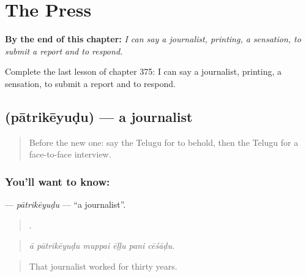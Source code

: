 
\chapter{The Press}
\label{ch:te-the-press}

\begin{chapteropening}
\textbf{By the end of this chapter:} \emph{I can say a journalist, printing, a sensation, to submit a report and to respond.}

Complete the last lesson of chapter 375: I can say a journalist, printing, a sensation, to submit a report and to respond.
\end{chapteropening}

\section[\texorpdfstring{\te{పాత్రికేయుడు} (pātrikēyuḍu)}{పాత్రికేయుడు (pātrikēyuḍu)}]{ (pātrikēyuḍu) — a journalist}

\label{lesson:TE-C375-patrikeyudu}



\begin{quote}
Before the new one: say the Telugu for to behold, then the Telugu for a face-to-face interview.
\end{quote}

\subsection*{You'll want to know: }
\textbf{} — \emph{pātrikēyuḍu} — \textquotedblleft{}a journalist\textquotedblright{}.

\begin{quote}
     .
\end{quote}

\begin{quote}
\emph{ā pātrikēyuḍu muppai ēḷḷu pani cēśāḍu.}
\end{quote}

\begin{quote}
That journalist worked for thirty years.
\end{quote}

